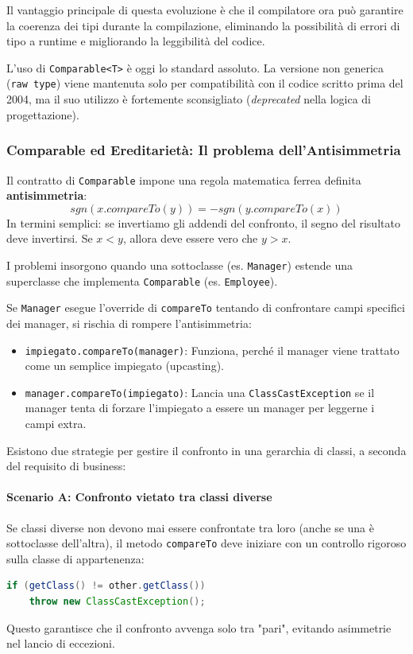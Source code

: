Il vantaggio principale di questa evoluzione è che il compilatore ora può garantire la coerenza dei tipi durante la compilazione, eliminando la possibilità di errori di tipo a runtime e migliorando la leggibilità del codice.

\begin{warningbox}
    L'uso di \texttt{Comparable<T>} è oggi lo standard assoluto. La versione non generica (\texttt{raw type}) viene mantenuta solo per compatibilità con il codice scritto prima del 2004, ma il suo utilizzo è fortemente sconsigliato (\textit{deprecated} nella logica di progettazione).
\end{warningbox}

\subsubsection*{Comparable ed Ereditarietà: Il problema dell'Antisimmetria}
Il contratto di \texttt{Comparable} impone una regola matematica ferrea definita \textbf{antisimmetria}:
\begin{equation}
    sgn(x.compareTo(y)) = -sgn(y.compareTo(x))
\end{equation}
In termini semplici: se invertiamo gli addendi del confronto, il segno del risultato deve invertirsi. Se $x < y$, allora deve essere vero che $y > x$.
\vspace{\baselineskip}

I problemi insorgono quando una sottoclasse (es. \texttt{Manager}) estende una superclasse che implementa \texttt{Comparable} (es. \texttt{Employee}). 

Se \texttt{Manager} esegue l'override di \texttt{compareTo} tentando di confrontare campi specifici dei manager, si rischia di rompere l'antisimmetria:
\begin{itemize}
    \item \texttt{impiegato.compareTo(manager)}: Funziona, perché il manager viene trattato come un semplice impiegato (upcasting).
    \item \texttt{manager.compareTo(impiegato)}: Lancia una \texttt{ClassCastException} se il manager tenta di forzare l'impiegato a essere un manager per leggerne i campi extra.
\end{itemize}
\vspace{\baselineskip}

Esistono due strategie per gestire il confronto in una gerarchia di classi, a seconda del requisito di business:

\paragraph{Scenario A: Confronto vietato tra classi diverse}
Se classi diverse non devono mai essere confrontate tra loro (anche se una è sottoclasse dell'altra), il metodo \texttt{compareTo} deve iniziare con un controllo rigoroso sulla classe di appartenenza:
\begin{lstlisting}[language=Java]
if (getClass() != other.getClass()) 
    throw new ClassCastException();
\end{lstlisting}
Questo garantisce che il confronto avvenga solo tra "pari", evitando asimmetrie nel lancio di eccezioni.


